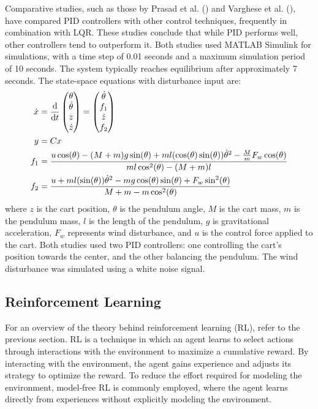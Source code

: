 Comparative studies, such as those by Prasad et al. (\citeyear{prasad_optimal_2011}) and Varghese et al. (\citeyear{varghese_optimal_2017}), have compared PID controllers with other control techniques, frequently in combination with LQR. These studies conclude that while PID performs well, other controllers tend to outperform it. Both studies used MATLAB Simulink for simulations, with a time step of 0.01 seconds and a maximum simulation period of 10 seconds. The system typically reaches equilibrium after approximately 7 seconds. The state-space equations with disturbance input are:
\begin{align}
    \dot{x} &= \frac{\mathrm{d}}{\mathrm{d}t}\begin{pmatrix}
        \theta \\
        \dot{\theta} \\
        z \\
        \dot{z}
    \end{pmatrix} = \begin{pmatrix}
        \dot{\theta} \\
        f_1 \\
        \dot{z} \\
        f_2
    \end{pmatrix} \notag \\
    y &= Cx \notag \\
    f_1 &= \frac{u\cos(\theta) - (M+m)g\sin(\theta) + ml(\cos(\theta)\sin(\theta))\dot{\theta}^2 - \frac{M}{m}F_w\cos(\theta)}{ml\cos^2(\theta) - (M+m)l} \notag \\
    f_2 &= \frac{u + ml(\sin(\theta))\dot{\theta}^2 - mg\cos(\theta)\sin(\theta) + F_w\sin^2(\theta)}{M+m-m\cos^2(\theta)} \notag
\end{align}
where $z$ is the cart position, $\theta$ is the pendulum angle, $M$ is the cart mass, $m$ is the pendulum mass, $l$ is the length of the pendulum, $g$ is gravitational acceleration, $F_w$ represents wind disturbance, and $u$ is the control force applied to the cart. Both studies used two PID controllers: one controlling the cart's position towards the center, and the other balancing the pendulum. The wind disturbance was simulated using a white noise signal.

\subsection{Reinforcement Learning}

For an overview of the theory behind reinforcement learning (RL), refer to the previous section. RL is a technique in which an agent learns to select actions through interactions with the environment to maximize a cumulative reward. By interacting with the environment, the agent gains experience and adjusts its strategy to optimize the reward. To reduce the effort required for modeling the environment, model-free RL is commonly employed, where the agent learns directly from experiences without explicitly modeling the environment.

